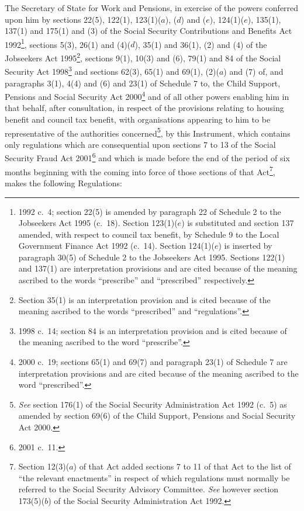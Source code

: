 \documentclass[12pt,a4paper]{article}
\title{\regstitle}
\author{S.I.\ 2002 No.\ 490}
\date{Made
5th March 2002\\
Laid before Parliament
8th March 2002\\
Coming into force
1st April 2002
}
\begin{document}
\maketitle

\enlargethispage{\baselineskip}

\noindent
The Secretary of State for Work and Pensions, in exercise of the powers conferred upon him by sections 22(5), 122(1), 123(1)($a$), ($d$)  and ($e$), 124(1)($e$), 135(1), 137(1) and 175(1) and (3) of the Social Security Contributions and Benefits Act 1992\footnote{1992 c.\ 4; section 22(5) is amended by paragraph 22 of Schedule 2 to the Jobseekers Act 1995 (c.\ 18). Section 123(1)($e$) is substituted and section 137 amended, with respect to council tax benefit, by Schedule 9 to the Local Government Finance Act 1992 (c.\ 14). Section 124(1)($e$) is inserted by paragraph 30(5) of Schedule 2 to the Jobseekers Act 1995. Sections 122(1) and 137(1) are interpretation provisions and are cited because of the meaning ascribed to the words “prescribe” and “prescribed” respectively.}, sections 5(3), 26(1) and (4)($d$), 35(1) and 36(1), (2) and (4) of the Jobseekers Act 1995\footnote{Section 35(1) is an interpretation provision and is cited because of the meaning ascribed to the words “prescribed” and “regulations”.}, sections 9(1), 10(3) and (6), 79(1) and 84 of the Social Security Act 1998\footnote{1998 c.\ 14; section 84 is an interpretation provision and is cited because of the meaning ascribed to the word “prescribe”.} and sections 62(3), 65(1) and 69(1), (2)($a$)  and (7) of, and paragraphs 3(1), 4(4) and (6) and 23(1) of Schedule 7 to, the Child Support, Pensions and Social Security Act 2000\footnote{2000 c.\ 19; sections 65(1) and 69(7) and paragraph 23(1) of Schedule 7 are interpretation provisions and are cited because of the meaning ascribed to the word “prescribed”.} and of all other powers enabling him in that behalf, after consultation, in respect of the provisions relating to housing benefit and council tax benefit, with organisations appearing to him to be representative of the authorities concerned\footnote{\emph{See} section 176(1) of the Social Security Administration Act 1992 (c.\ 5) as amended by section 69(6) of the Child Support, Pensions and Social Security Act 2000.}, by this Instrument, which contains only regulations which are consequential upon sections 7 to 13 of the Social Security Fraud Act 2001\footnote{2001 c.\ 11.} and which is made before the end of the period of six months beginning with the coming into force of those sections of that Act\footnote{Section 12(3)($a$) of that Act added sections 7 to 11 of that Act to the list of “the relevant enactments” in respect of which regulations must normally be referred to the Social Security Advisory Committee. \emph{See} however section 173(5)($b$) of the Social Security Administration Act 1992.}, makes the following Regulations: 
\end{document}
